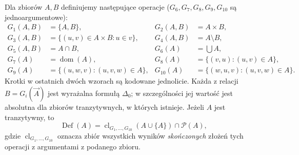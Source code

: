 \begin{lemat}
\label{lem:l-godel-normal-closure}
Dla zbiorów $A,B$ definiujemy następujące operacje
($G_6,G_7,G_8,G_9,G_{10}$ są jednoargumentowe):
\begin{align*}
G_1(A,B)&=\{A,B\}, &G_2(A,B)&=A\times B,\\
G_3(A,B)&=\{(u,v)\in A\times B:u\in v\},
 &G_4(A,B)&=A\setminus B,\\
G_5(A,B)&=A\cap B, &G_6(A)&=\bigcup A,\\
G_7(A)&=\operatorname{dom}(A),
 &G_8(A)&=\{(v,u):(u,v)\in A\},\\
G_9(A)&=\{(u,w,v):(u,v,w)\in A\},
 &G_{10}(A)&=\{(w,u,v):(u,v,w)\in A\}.
\end{align*}
Krotki w ostatnich dwóch wzorach są kodowane jednolicie.
Każda z relacji $B=G_i(\vec A)$ jest wyrażalna
formułą $\Delta_0$; w szczególności jej wartość jest
absolutna dla zbiorów tranzytywnych, w których istnieje.
Jeżeli $A$ jest tranzytywny, to
\[
\operatorname{Def}(A)
=\operatorname{cl}_{G_1,\ldots,G_{10}}(A\cup\{A\})
\cap\mathcal P(A),
\]
gdzie $\operatorname{cl}_{G_1,\ldots,G_{10}}$ oznacza
zbiór wszystkich wyników \emph{skończonych} złożeń tych
operacji z argumentami z podanego zbioru.
\end{lemat}
